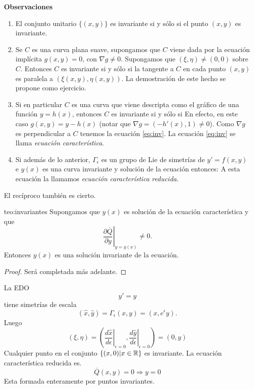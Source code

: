 \noindent\textbf{Observaciones}
\begin{enumerate}
\item El conjunto unitario $\{(x,y)\}$ es invariante si y sólo si el punto $(x,y)$ 
es invariante.

\item Se $C$ es una curva plana suave, supongamos que $C$ viene dada por la ecuación implícita $g(x,y)=0$, con $\nabla g\neq 0$.  Supongamos que  $(\xi,\eta)\neq (0,0)$ sobre $C$. Entonces $C$ es invariante si y sólo si la tangente a  $C$ en cada punto $(x,y)$ es
paralela a $(\xi(x,y),\eta(x,y))$. La demostración de este hecho se propone como ejercicio.  
\item Si en particular $C$ es una curva que viene descripta como el gráfico de una función $y=h(x)$, entonces $C$ es invariante si y sólo si
En efecto, en este caso $g(x,y)=y-h(x)$ (notar que $\nabla g=(-h'(x),1)\neq 0$). Como $\nabla g$ es perpendicular a $C$ tenemos la ecuación \eqref{eq:inv}. La ecuación \eqref{eq:inv} se llama \emph{ecuación característica}.






\item Si además de lo anterior, $\Gamma_{\epsilon}$ es un grupo de Lie de simetrías de $y'=f(x,y)$ e $y(x)$ es una curva invariante y solución de la ecuación entonces:
A esta ecuación la llamamos  \emph{ecuación característica reducida}.

 \end{enumerate}


El recíproco también es cierto.
\begin{teorema}{teo:invariantes}
 Supongamos que $y(x)$ es solución de la ecuación característica y que
 \[\left.\frac{\partial \overline{Q}}{\partial y}\right|_{y=y(x)}\neq 0.\]
 Entonces $y(x)$ es una solución invariante de la ecuación.
\end{teorema}
\begin{proof} Será completada más adelante.
 
\end{proof}




\begin{ejemplo}{} La EDO
\begin{equation}\label{eq:eq_simple}y'=y
 \end{equation}
tiene simetrías de escala
\[(\hat{x},\hat{y})=\Gamma_{\epsilon}(x,y)=(x,e^{\epsilon}y).
 \]
Luego 
\[(\xi,\eta)=\left(\left.\frac{d\hat{x}}{d\epsilon}\right|_{\epsilon=0}, \left.\frac{d\hat{y}}{d\epsilon}\right|_{\epsilon=0}   \right)=(0,y)\]
Cualquier punto en el conjunto $\{(x,0)|x\in\mathbb{R}\}$  es invariante. La ecuación característica reducida es.
\[\overline{Q}(x,y)=0\Rightarrow y=0\]
Esta formada enteramente por puntos invariantes.
\end{ejemplo}



